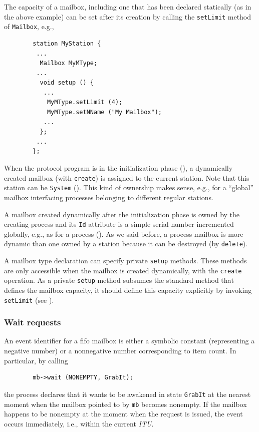 The capacity of a mailbox, including one that has been
declared statically (as in the above example)
can be set after its creation by calling the
{\tt setLimit} method of {\tt Mailbox}, e.g.,
\begin{verbatim}
        station MyStation {
         ...
          Mailbox MyMType;
         ...
          void setup () {
           ...
            MyMType.setLimit (4);
            MyMType.setNName ("My Mailbox");
           ...
          };
         ...
        };
\end{verbatim}

When the protocol program is in the initialization phase
(), a dynamically created mailbox (with {\tt create})
is assigned to the current station.
Note that this station can be {\tt System} ().
This kind of ownership makes sense, e.g., for a ``global'' mailbox
interfacing processes belonging to different regular stations.

A mailbox created dynamically after the initialization phase
is owned by the creating process and its {\tt Id} attribute
is a simple serial number incremented globally, e.g., as
for a process ().
As we said before, a process mailbox is more dynamic than one owned by a
station because it can be destroyed (by {\tt delete}).

A mailbox type declaration can specify private {\tt setup} methods.
These methods are only accessible when the mailbox is created dynamically,
with the {\tt create} operation.
As a private {\tt setup} method subsumes the standard method that defines
the mailbox capacity, it should define this capacity explicitly
by invoking {\tt setLimit} (see ).

\subsubsection{Wait requests}
\label{rm_mb_fi_wr}

An event identifier for a fifo mailbox is either a symbolic constant
(representing a negative number) or a nonnegative number corresponding
to item count.
In particular, by calling
\begin{verbatim}
        mb->wait (NONEMPTY, GrabIt);
\end{verbatim}
the process declares that it
wants to be awakened in state {\tt GrabIt} at the nearest
moment when the mailbox pointed to by {\tt mb} becomes nonempty.
If the mailbox happens to be nonempty at the moment when the request is
issued, the event occurs immediately, i.e., within the current {\em ITU}.

